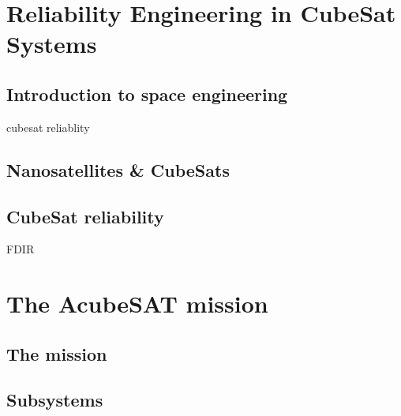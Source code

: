 \documentclass[a4paper,nobib]{tufte-book}
\begin{document}
\chapter{Reliability Engineering in CubeSat Systems}
\label{sec:fdir}






\section{Introduction to space engineering}
cubesat reliablity \autocite{durou_hierarchical_fault_2002}

\section{Nanosatellites \& CubeSats}

\section{CubeSat reliability}

\acf{FDIR}

\chapter{The AcubeSAT mission}

\section{The mission}

\section{Subsystems}
\end{document}
